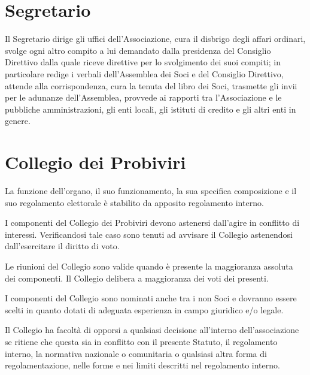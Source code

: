 \documentclass[legalpaper, 11pt]{exam}
\let\tempone\enumerate
\let\temptwo\endenumerate
\renewenvironment{enumerate}{\tempone\addtolength{\itemsep}{-0.45\baselineskip}}{\temptwo}
\begin{document}
{\section{Segretario}
\begin{enumerate}
 \item Il Segretario dirige gli uffici dell’Associazione, cura il disbrigo degli affari ordinari, svolge ogni altro compito a lui demandato dalla presidenza del Consiglio Direttivo dalla quale riceve direttive per lo svolgimento dei suoi compiti; in particolare redige i verbali dell’Assemblea dei Soci e del Consiglio Direttivo, attende alla corrispondenza, cura la tenuta del libro dei Soci, trasmette gli invii per le adunanze dell’Assemblea, provvede ai rapporti tra l’Associazione e le pubbliche amministrazioni, gli enti locali, gli istituti di credito e gli altri enti in genere.
\end{enumerate}

\section{Collegio dei Probiviri}
\begin{enumerate}
 \item La funzione dell’organo, il suo funzionamento, la sua specifica composizione e il suo regolamento elettorale è stabilito da apposito regolamento interno.
 \item I componenti del Collegio dei Probiviri devono astenersi dall’agire in conflitto di interessi. Verificandosi tale caso sono tenuti ad avvisare il Collegio astenendosi dall’esercitare il diritto di voto.
 \item Le riunioni del Collegio sono valide quando è presente la maggioranza assoluta dei componenti. Il Collegio delibera a maggioranza dei voti dei presenti.
 \item I componenti del Collegio sono nominati anche tra i non Soci e dovranno essere scelti in quanto dotati di adeguata esperienza in campo giuridico e/o legale.
 \item Il Collegio ha facoltà di opporsi a qualsiasi decisione all'interno dell'associazione se ritiene che questa sia in conflitto con il presente Statuto, il regolamento interno, la normativa nazionale o comunitaria o qualsiasi altra forma di regolamentazione, nelle forme e nei limiti descritti nel regolamento interno.
\end{enumerate}

}
\end{document}
